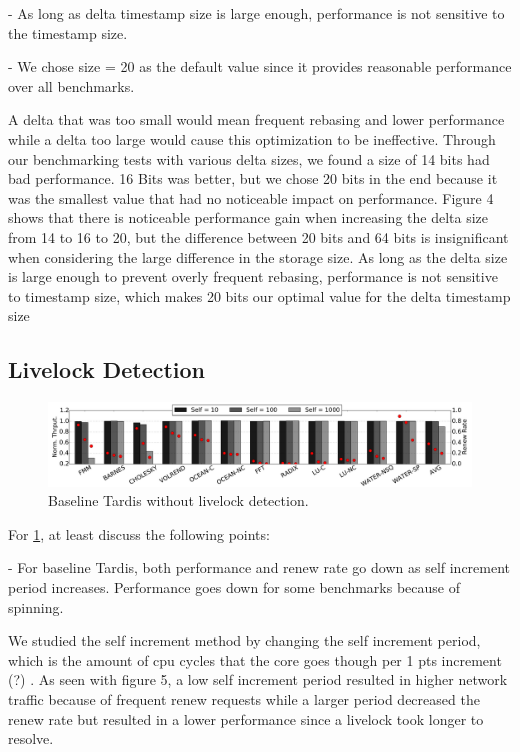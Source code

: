 \documentclass[12pt]{article}
\begin{document}
- As long as delta timestamp size is large enough, performance is not 
  sensitive to the timestamp size.

- We chose size = 20 as the default value since it provides reasonable 
  performance over all benchmarks.


A delta that was too small would mean frequent rebasing and lower performance while a delta too large would cause this optimization to be ineffective. Through our benchmarking tests with various delta sizes, we found a size of 14 bits had bad performance. 16 Bits was better, but we chose 20 bits in the end because it was the smallest value that had no noticeable impact on performance. Figure 4 shows that  there is noticeable performance gain when increasing the delta size from 14 to 16 to 20, but the difference between 20 bits and 64 bits is insignificant when considering the large difference in the storage size. As long as the delta size is large enough to prevent overly frequent rebasing, performance is not sensitive to timestamp size, which makes 20 bits our optimal value for the delta timestamp size
\subsection{Livelock Detection}

\begin{figure}
	\centering
	\includegraphics[width=0.95\columnwidth]{figs/selfincr_nolive.pdf}
	\caption{ Baseline Tardis without livelock detection. }
	\label{fig:self-nolive}
\end{figure}

For \cref{fig:self-nolive}, at least discuss the following points:

- For baseline Tardis, both performance and renew rate go down as self
  increment period increases. Performance goes down for some
  benchmarks because of spinning.
  
  We studied the self increment method by changing the self increment period, which is the amount of cpu cycles that the core goes though per 1 pts increment (?) . As seen with figure 5, a low self increment period resulted in higher network traffic because of frequent renew requests while a larger period decreased the renew rate but resulted in a lower performance since a livelock took longer to resolve.  
  
\end{document}
